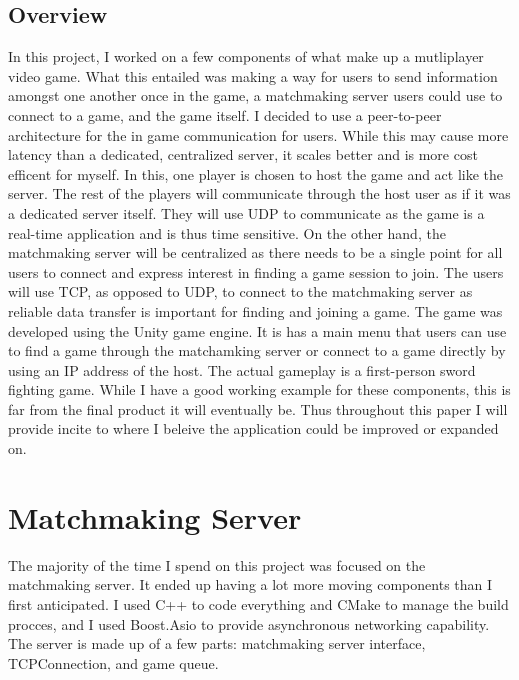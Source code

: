 \documentclass[conference]{IEEEtran}
\begin{document}
\subsection{Overview}
In this project, I worked on a few components of what make up a mutliplayer video game.
What this entailed was making a way for users to send information amongst one another once in the game, a matchmaking server users could use to connect to a game, and the game itself.
I decided to use a peer-to-peer architecture for the in game communication for users. 
While this may cause more latency than a dedicated, centralized server, it scales better and is more cost efficent for myself.
In this, one player is chosen to host the game and act like the server.
The rest of the players will communicate through the host user as if it was a dedicated server itself.
They will use UDP to communicate as the game is a real-time application and is thus time sensitive.
On the other hand, the matchmaking server will be centralized as there needs to be a single point for all users to connect and express interest in finding a game session to join.
The users will use TCP, as opposed to UDP, to connect to the matchmaking server as reliable data transfer is important for finding and joining a game.
The game was developed using the Unity game engine. 
It is has a main menu that users can use to find a game through the matchamking server or connect to a game directly by using an IP address of the host.
The actual gameplay is a first-person sword fighting game.
While I have a good working example for these components, this is far from the final product it will eventually be.
Thus throughout this paper I will provide incite to where I beleive the application could be improved or expanded on.

\section{Matchmaking Server}
The majority of the time I spend on this project was focused on the matchmaking server.
It ended up having a lot more moving components than I first anticipated.
I used C++ to code everything and CMake to manage the build procces, and I used Boost.Asio to provide asynchronous networking capability.
The server is made up of a few parts: matchmaking server interface, TCPConnection, and game queue.
\end{document}
